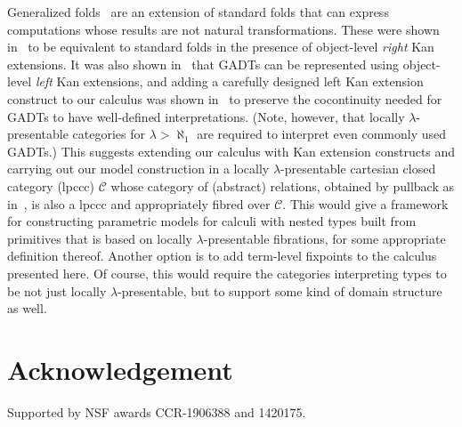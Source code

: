 \documentclass{lmcs}
\theoremstyle{plain}\newtheorem{satz}[thm]{Satz}
\newcommand{\cal}{\mathcal}
\newcommand{\set}{\mathsf{Set}}
\begin{document}
Generalized folds~\cite{bp99} are an extension of standard folds that
can express computations whose results are not natural
transformations. These were shown in~\cite{jg10} to be equivalent to
standard folds in the presence of object-level {\em right} Kan
extensions.
It was also shown in~\cite{jg08} that GADTs can be represented using
object-level {\em left} Kan extensions, and
%
%
adding a carefully designed left Kan extension construct to our
calculus was shown in~\cite{jp19} to preserve the cocontinuity needed
for GADTs to have well-defined interpretations. (Note, however, that
locally $\lambda$-presentable categories for $\lambda > \aleph_1$ are
required to interpret even commonly used GADTs.) This suggests
extending our calculus with Kan extension constructs and
carrying out our model construction in a locally $\lambda$-presentable
cartesian closed category (lpccc) $\cal C$ whose category of
(abstract) relations, obtained by pullback as in~\cite{jac99},
is also a lpccc and appropriately fibred over $\cal C$.  This would
give a framework for constructing parametric models for calculi
with nested types built from primitives that is based on locally
$\lambda$-presentable fibrations, for some appropriate definition
thereof.  Another option is to add term-level fixpoints
to the calculus presented here. Of course, this would require the
categories interpreting types to be not just locally
$\lambda$-presentable, but to support some kind of domain structure as
well.

\pagebreak

\noindent

\section*{Acknowledgement}
Supported by NSF awards CCR-1906388 and 1420175.



\begin{thebibliography}{key}
%
\end{thebibliography}

  
\end{document}
